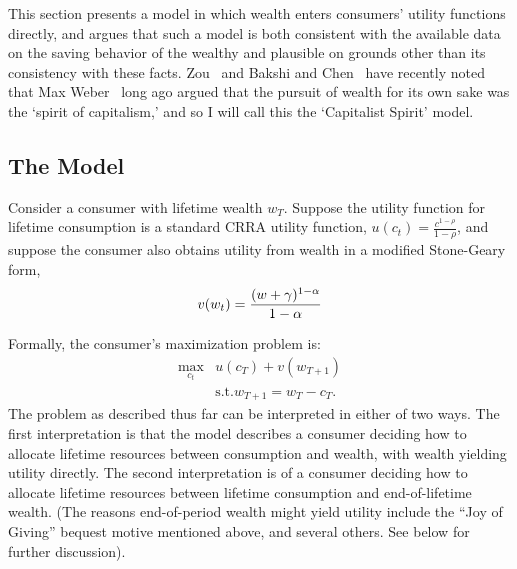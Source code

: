 \documentclass[titlepage,12pt]{article}
\begin{document}
This section presents a model in which wealth enters consumers' 
utility functions directly, and argues that such a model is both 
consistent with the available data on the saving behavior of the 
wealthy and plausible on grounds other than its consistency with 
these facts.  Zou~\cite{zou:spirit} and Bakshi and 
Chen~\cite{bakshi&chen:spirit} have recently noted that Max 
Weber~\cite{weber:capitalism} long ago argued that the pursuit of 
wealth for its own sake was the `spirit of capitalism,' and so I will 
call this the `Capitalist Spirit' model.

\hypertarget{the-model}{}
\subsection{The Model}
\label{subsec:CapitalistModel}

Consider a consumer with lifetime wealth $w_{T}$.  Suppose the utility 
function for lifetime consumption is a standard CRRA utility function, 
$u(c_{t}) = \frac{c^{1-\rho}}{1-\rho}$, and suppose the consumer also 
obtains utility from wealth in a modified Stone-Geary form,
$$
  v(w_{t}) = \frac{(w + \gamma)^{1-\alpha}}{1-\alpha} \notag
$$

Formally, the consumer's maximization problem is:
\begin{eqnarray}
 	\max_{c_{t}} & u(c_{T}) + v(w_{T+1}) \\ \nonumber
  	           & \mbox{s.t.} w_{T+1} = w_{T} - c_{T}.  \nonumber
	\label{eq:LastPeriodProb}
\end{eqnarray}
The problem as described thus far can be interpreted in either of two 
ways.  The first interpretation is that the model describes a consumer 
deciding how to allocate lifetime resources between consumption and 
wealth, with wealth yielding utility directly.  The second 
interpretation is of a consumer deciding how to allocate lifetime 
resources between lifetime consumption and end-of-lifetime wealth.  
(The reasons end-of-period wealth might yield utility include the ``Joy 
of Giving'' bequest motive mentioned above, and several others.  See 
below for further discussion).  
\end{document}
